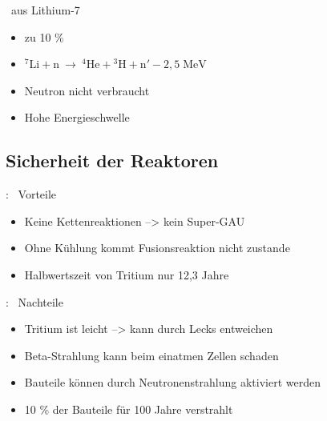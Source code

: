 \documentclass[10pt,a4paper, ngerman]{beamer}
\begin{document}
\begin{frame}{\subsecname \ aus Lithium-7}{\secname}
\begin{itemize}
\item zu 10 \%
\item \(^{7}{\mathrm  {Li}}+{\mathrm  {n}}\ \rightarrow \ ^{4}{\mathrm  {He}}+{}^{3}{\mathrm  {H}}+{\mathrm  {n}}'-2{,}5\;{\mathrm  {MeV}}\)
\item Neutron nicht verbraucht
\item Hohe Energieschwelle
\end{itemize}
\end{frame}

\subsection{Sicherheit der Reaktoren}
\begin{frame}{\subsecname: \ Vorteile}{\secname}
\begin{itemize}
\item Keine Kettenreaktionen --> kein Super-GAU
\item Ohne Kühlung kommt Fusionsreaktion nicht zustande
\item Halbwertszeit von Tritium nur 12,3 Jahre
\end{itemize}
\end{frame}

\begin{frame}{\subsecname: \ Nachteile}{\secname}
\begin{itemize}
\item Tritium ist leicht --> kann durch Lecks entweichen
\item Beta-Strahlung kann beim einatmen Zellen schaden
\item Bauteile können durch Neutronenstrahlung aktiviert werden
\item 10 \% der Bauteile für 100 Jahre verstrahlt
\end{itemize}
\end{frame}

\begin{frame}
\titlepage
\end{frame}
\end{document}
